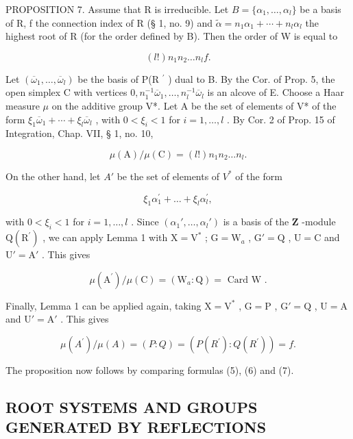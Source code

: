 PROPOSITION 7. Assume that R is irreducible. Let \(B = \{\alpha_{1}, \ldots, \alpha_{l}\}\) be a basis of R, f the connection index of R (§ 1, no. 9) and \(\tilde{\alpha} = n_{1}\alpha_{1} + \cdots + n_{l}\alpha_{l}\) the highest root of R (for the order defined by B). Then the order of W is equal to

\[
(l!) n _ {1} n _ {2} \dots n _ {l} f.
\]

Let \((\overline{\omega}_{1},\ldots,\overline{\omega}_{l})\) be the basis of P(R \(^{\prime}\) ) dual to B. By the Cor. of Prop. 5, the open simplex C with vertices \(0,n_{1}^{-1}\overline{\omega}_{1},\ldots,n_{l}^{-1}\overline{\omega}_{l}\) is an alcove of E. Choose a Haar measure \(\mu\) on the additive group V*. Let A be the set of elements of V* of the form \(\xi_{1}\overline{\omega}_{1}+\cdots+\xi_{l}\overline{\omega}_{l}\) , with \(0<\xi_{i}<1\) for \(i=1,\ldots,l\) . By Cor. 2 of Prop. 15 of Integration, Chap. VII, § 1, no. 10,

\[
\mu (\mathrm{A}) / \mu (\mathrm{C}) = (l!) n _ {1} n _ {2} \dots n _ {l}.\tag{5}
\]

On the other hand, let \(A'\) be the set of elements of \(V^{*}\) of the form

\[
\xi_ {1} \alpha_ {1} ^ {\prime} + \dots + \xi_ {l} \alpha_ {l} ^ {\prime},
\]

with \(0 < \xi_i < 1\) for \(i = 1, \ldots, l\) . Since \((\alpha_1', \ldots, \alpha_l')\) is a basis of the \(\mathbf{Z}\) -module \(\mathrm{Q}(\mathrm{R}^{\prime})\) , we can apply Lemma 1 with \(\mathrm{X} = \mathrm{V}^*\) ; \(\mathrm{G} = \mathrm{W}_a\) , \(\mathrm{G}' = \mathrm{Q}\) , \(\mathrm{U} = \mathrm{C}\) and \(\mathrm{U}' = \mathrm{A}'\) . This gives

\[
\mu \left(\mathrm{A} ^ {\prime}\right) / \mu (\mathrm{C}) = \left(\mathrm{W} _ {a}: \mathrm{Q}\right) = \text { Card   W }.\tag{6}
\]

Finally, Lemma 1 can be applied again, taking \(\mathrm{X} = \mathrm{V}^*\) , \(\mathrm{G} = \mathrm{P}\) , \(\mathrm{G}' = \mathrm{Q}\) , \(\mathrm{U} = \mathrm{A}\) and \(\mathrm{U}' = \mathrm{A}'\) . This gives

\[
\mu (A ^ {\prime}) / \mu (A) = (P: Q) = (P (R ^ {\prime}): Q (R ^ {\prime})) = f.\tag{7}
\]

The proposition now follows by comparing formulas (5), (6) and (7).

\subsection{ROOT SYSTEMS AND GROUPS GENERATED BY REFLECTIONS}

